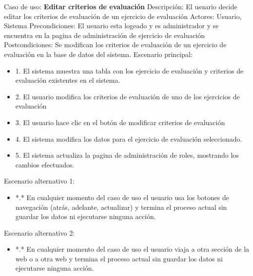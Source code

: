 Caso de uso: \textbf{Editar criterios de evaluación}
\newline
Descripción: El usuario decide editar los criterios de evaluación de un ejercicio de evaluación
\newline
Actores: Usuario, Sistema
\newline
Precondiciones: El usuario esta logeado y es administrador y se encuentra en la pagina de administración de ejercicio de evaluación
\newline
Postcondiciones: Se modifican los criterios de evaluación de un ejercicio de evaluación en la base de datos del sistema.
\newline
Escenario principal:
\begin{itemize}
	\item 1. El sistema muestra una tabla con los ejercicio de evaluación y criterios de evaluación existentes en el sistema.
	\item 2. El usuario modifica los criterios de evaluación de uno de los ejercicios de evaluación
	\item 3. El usuario hace clic en el botón de modificar criterios de evaluación
	\item 4. El sistema modifica los datos para el ejercicio de evaluación seleccionado.
	\item 5. El sistema actualiza la pagina de administración de roles, mostrando los cambios efectuados.
\end{itemize}
Escenario alternativo 1: 
\begin{itemize}
	\item *.* En cualquier momento del caso de uso el usuario usa los botones de navegación (atrás, adelante, actualizar) y termina el proceso actual sin guardar los datos ni ejecutarse ninguna acción.
\end{itemize}
Escenario alternativo 2:
\begin{itemize}
	\item *.* En cualquier momento del caso de uso el usuario viaja a otra sección de la web o a otra web y termina el proceso actual sin guardar los datos ni ejecutarse ninguna acción.
\end{itemize}

